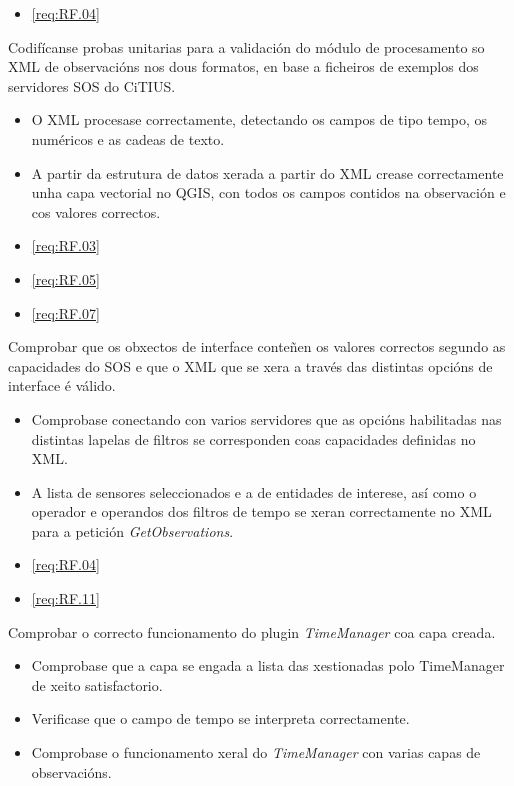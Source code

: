 		  {\begin{itemize}\item \ref{req:RF.04} \\\end{itemize}} %
		  {Codifícanse probas unitarias para a validación do módulo de procesamento so XML de observacións nos dous formatos, en base a ficheiros de exemplos dos servidores SOS do CiTIUS.} %
		  {\begin{itemize}
		  \item O XML procesase correctamente, detectando os campos de tipo tempo, os numéricos e as cadeas de texto.
		  \item A partir da estrutura de datos xerada a partir do XML crease correctamente unha capa vectorial no QGIS, con todos os campos contidos na observación e cos valores correctos.
		  \end{itemize}} %

		  {\begin{itemize}\item \ref{req:RF.03} \item \ref{req:RF.05} \item \ref{req:RF.07}\end{itemize}} %
		  {Comprobar que os obxectos de interface conteñen os valores correctos segundo as capacidades do SOS e que o XML que se xera a través das distintas opcións de interface é válido.} %
		  {\begin{itemize}
		  \item Comprobase conectando con varios servidores que as opcións habilitadas nas distintas lapelas de filtros se corresponden coas capacidades definidas no XML.
		  \item A lista de sensores seleccionados e a de entidades de interese, así como o operador e operandos dos filtros de tempo se xeran correctamente no XML para a petición \emph{GetObservations}.
		  \end{itemize}} %

		  {\begin{itemize}\item \ref{req:RF.04} \item \ref{req:RF.11} \end{itemize}} %
		  {Comprobar o correcto funcionamento do plugin \emph{TimeManager} coa capa creada.} %
		  {\begin{itemize}
		  \item Comprobase que a capa se engada a lista das xestionadas polo TimeManager de xeito satisfactorio.
		  \item Verificase que o campo de tempo se interpreta correctamente.
		  \item Comprobase o funcionamento xeral do \emph{TimeManager} con varias capas de observacións.
		  \end{itemize}} %
		  
